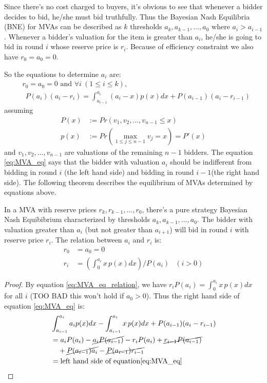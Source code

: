 Since there's no cost charged to buyers, it's obvious to see that whenever a
bidder decides to bid, he/she must bid truthfully. Thus the Bayesian Nash
Equilibria (BNE) for MVAs can be described as $k$ thresholds $a_k, a_{k-1},
\ldots, a_0$ where $a_i > a_{i-1}$. Whenever a bidder's valuation for the item
is greater than $a_i$, he/she is going to bid in round $i$ whose reserve price
is $r_i$. Because of efficiency constraint we also have $r_0 = a_0 = 0$.

So the equations to determine $a_i$ are: 
\begin{align}\label{eq:MVA_eq}
    &r_0 = a_0 = 0 \mbox{ and }
    \forall i ~(1 \leq i \leq k),\nonumber\\
    &~~P(a_{i})(a_{i}-r_i) =
    \int_{a_{i-1}}^{a_{i}}(a_{i}-x)p(x)dx+P(a_{i-1})(a_{i}-r_{i-1})
\end{align}
assuming
\begin{align*}
    P(x) &:= Pr(v_{1},v_{2},\ldots,v_{n-1}\leq x)\\
    p(x) &:= Pr(\max_{1 \leq j\leq n-1}v_{j}=x)=P'(x)
\end{align*}
and $v_1, v_2, \ldots, v_{n-1}$ are valuations of the remaining $n-1$ bidders.
The equation \ref{eq:MVA_eq} says that the bidder with valuation $a_i$ should be
indifferent from bidding in round $i$ (the left hand side) and bidding in round
$i-1$(the right hand side).  The following theorem describes the equilibrium of
MVAs determined by equations above.

\begin{theorem}
In a MVA with reserve prices $r_k, r_{k-1}, \ldots, r_0$, there's a pure
strategy Bayesian Nash Equibibrium characterized by thresholds $a_k, a_{k-1},
\ldots, a_0$.  The bidder with valuation greater than $a_i$ (but not greater
than $a_{i+1}$) will bid in round $i$ with reserve price $r_i$. The relation
between $a_i$ and $r_i$ is:
\begin{align}\label{eq:MVA_eq_relation}
  r_0 &= a_0 = 0 \nonumber \\
  r_i &= \left( \int_{0}^{a_i} x \, p(x) dx \right) / P(a_i) & (i > 0)
\end{align}
\end{theorem}

\begin{proof}
By equation \ref{eq:MVA_eq_relation}, we have $r_i P(a_i) = \int_{0}^{a_i}
x\,p(x)dx$ for all $i$ (TOO BAD this won't hold if $a_0 > 0$). Thus the right
hand side of equation \ref{eq:MVA_eq} is:
\begin{align*}
	& \int_{a_{i-1}}^{a_i} a_i p(x) dx - \int_{a_{i-1}}^{a_i} x \, p(x) dx + P(a_{i-1})(a_i-r_{i-1}) \\
	&= a_i P(a_i) - \cancel{a_i P(a_{i-1})} - r_i P(a_i) + \cancel{r_{i-1} P(a_{i-1})} \\
		& ~~~ + \cancel{P(a_{i-1}) a_i} - \cancel{P(a_{i-1}) r_{i-1}}\\
	&= \mbox{left hand side of equation\ref{eq:MVA_eq}}
\end{align*}
\end{proof}

